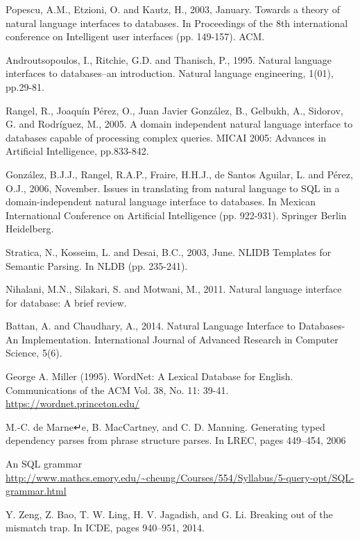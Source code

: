 \cleardoublepage
{}
{}
\begin{thebibliography}{99}

Popescu, A.M., Etzioni, O. and Kautz, H., 2003, January. Towards a theory of natural language interfaces to databases. In Proceedings of the 8th international conference on Intelligent user interfaces (pp. 149-157). ACM.

Androutsopoulos, I., Ritchie, G.D. and Thanisch, P., 1995. Natural language interfaces to databases–an introduction. Natural language engineering, 1(01), pp.29-81.

 Rangel, R., Joaquín Pérez, O., Juan Javier González, B., Gelbukh, A., Sidorov, G. and Rodríguez, M., 2005. A domain independent natural language interface to databases capable of processing complex queries. MICAI 2005: Advances in Artificial Intelligence, pp.833-842.

 González, B.J.J., Rangel, R.A.P., Fraire, H.H.J., de Santos Aguilar, L. and Pérez, O.J., 2006, November. Issues in translating from natural language to SQL in a domain-independent natural language interface to databases. In Mexican International Conference on Artificial Intelligence (pp. 922-931). Springer Berlin Heidelberg.

 Stratica, N., Kosseim, L. and Desai, B.C., 2003, June. NLIDB Templates for Semantic Parsing. In NLDB (pp. 235-241).

 Nihalani, M.N., Silakari, S. and Motwani, M., 2011. Natural language interface for database: A brief review.

 Battan, A. and Chaudhary, A., 2014. Natural Language Interface to Databases-An Implementation. International Journal of Advanced Research in Computer Science, 5(6).

 George A. Miller (1995). WordNet: A Lexical Database for English.
Communications of the ACM Vol. 38, No. 11: 39-41. \url{https://wordnet.princeton.edu/}

 M.-C. de Marne↵e, B. MacCartney, and C. D.
Manning. Generating typed dependency parses from
phrase structure parses. In LREC, pages 449–454,
2006

 An SQL grammar  \url{http://www.mathcs.emory.edu/~cheung/Courses/554/Syllabus/5-query-opt/SQL-grammar.html}

 Y. Zeng, Z. Bao, T. W. Ling, H. V. Jagadish, and
G. Li. Breaking out of the mismatch trap. In ICDE,
pages 940–951, 2014.




\end{thebibliography}
